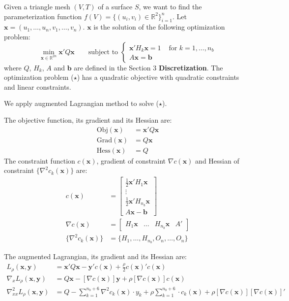 \documentclass{article} %
\begin{document}
Given a triangle mesh $(V, T)$ of a surface $S$, we want to find the parameterization function $f(V) = \{ (u_i, v_i) \in \mathbb{R}^2 \}_{i = 1}^{n}$. Let $\mathbf{x} = (u_1, \dots, u_n, v_1, \dots, v_n)$. $\mathbf{x}$ is the solution of the following optimization problem:
\begin{equation}
\min_{\mathbf{x} \in \mathbb{R}^{2n} } \mathbf{x}'Q \mathbf{x} \qquad \text{subject to }
\begin{cases}
\mathbf{x}'H_k \mathbf{x} = 1 & \text{ for } k = 1, \dots, n_b \\
A \mathbf{x} = \mathbf{b} &
\end{cases} \tag{$\star$}
\end{equation}
where $Q$, $H_k$, $A$ and $\mathbf{b}$ are defined in the Section 3 \textbf{Discretization}. The optimization problem ($\star$) has a quadratic objective with quadratic constraints and linear constraints.

We apply augmented Lagrangian method to solve ($\star$).

The objective function, its gradient and its Hessian are:
\begin{align*}
\text{Obj}(\mathbf{x}) & = \mathbf{x}'Q \mathbf{x}  \\
\text{Grad}(\mathbf{x}) & = Q\mathbf{x}  \\ 
\text{Hess}(\mathbf{x}) & = Q
\end{align*}
The constraint function $c(\mathbf{x})$, gradient of constraint $\nabla c(\mathbf{x})$ and Hessian of constraint $\{ \nabla^2 c_k(\mathbf{x}) \}$ are:
\begin{align*}
c(\mathbf{x}) & = 
\begin{bmatrix}
\frac12 \mathbf{x}'H_1 \mathbf{x} \\
\vdots \\
\frac12 \mathbf{x}'H_{n_b} \mathbf{x} \\
A\mathbf{x} - \mathbf{b}
\end{bmatrix}
\\
\nabla c(\mathbf{x}) & = 
\begin{bmatrix}
H_1 \mathbf{x} & \dots & H_{n_b} \mathbf{x} & A'
\end{bmatrix}
\\
\{ \nabla^2 c_k(\mathbf{x}) \} & = 
\{ H_1, \dots, H_{n_b}, O_n, \dots, O_n \}
\end{align*}

The augmented Lagrangian, its gradient and its Hessian are:
\begin{align*}
L_\rho ( \mathbf{x}, \mathbf{y}) & =  
\mathbf{x}' Q \mathbf{x} - \mathbf{y}' c(\mathbf{x}) + \frac{\rho}{2} c(\mathbf{x})' c(\mathbf{x}) \\
\nabla_x L_\rho ( \mathbf{x}, \mathbf{y}) & = 
Q \mathbf{x} - [\nabla c(\mathbf{x})] \mathbf{y} + \rho [\nabla c(\mathbf{x})] c(\mathbf{x}) \\
\nabla^2_{xx} L_\rho ( \mathbf{x}, \mathbf{y}) & = 
Q - \sum_{k = 1}^{n_b + 6} \nabla^2 c_k(\mathbf{x}) \cdot y_k + \rho \sum_{k = 1}^{n_b + 6} \cdot c_k (\mathbf{x}) + \rho [\nabla c(\mathbf{x})] [\nabla c(\mathbf{x})]'
\end{align*}
\end{document}
